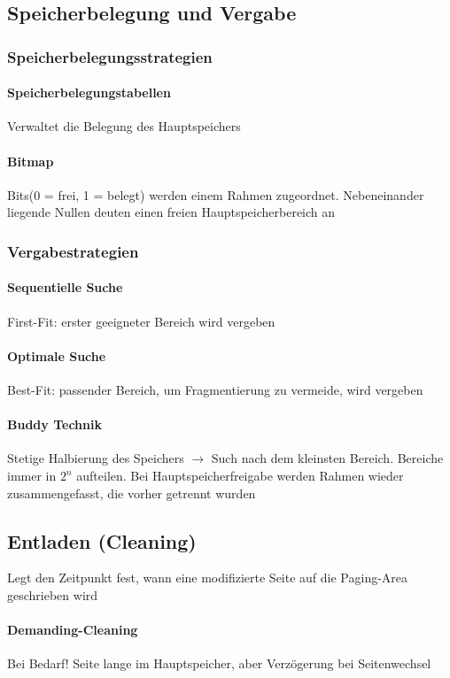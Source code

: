 \documentclass[10pt,a4paper,landscape]{article}
\begin{document}
\begin{multicols*}{3}
	\subsection{Speicherbelegung und Vergabe}
	\subsubsection{Speicherbelegungsstrategien}
	\paragraph{Speicherbelegungstabellen} Verwaltet die Belegung des Hauptspeichers
	\paragraph{Bitmap} Bits(0 = frei, 1 = belegt) werden einem Rahmen zugeordnet. Nebeneinander liegende Nullen deuten einen freien Hauptspeicherbereich an
	\subsubsection{Vergabestrategien}
	\paragraph{Sequentielle Suche} First-Fit: erster geeigneter Bereich wird vergeben
	\paragraph{Optimale Suche} Best-Fit: passender Bereich, um Fragmentierung zu vermeide, wird vergeben
	\paragraph{Buddy Technik} Stetige Halbierung des Speichers $\rightarrow$ Such nach dem kleinsten Bereich. Bereiche immer in $2^n$ aufteilen. Bei Hauptspeicherfreigabe werden Rahmen wieder zusammengefasst, die vorher getrennt wurden
	\subsection{Entladen (Cleaning)}
	Legt den Zeitpunkt fest, wann eine modifizierte Seite auf die Paging-Area geschrieben wird
	\paragraph{Demanding-Cleaning} Bei Bedarf! Seite lange im Hauptspeicher, aber Verzögerung bei Seitenwechsel

\end{multicols*}
\end{document}
